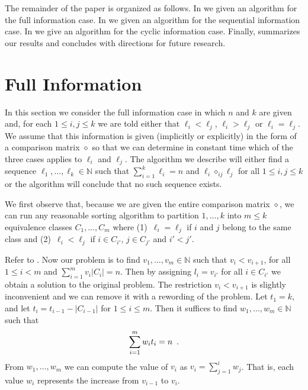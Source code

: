 \documentclass[11pt,a4paper]{article}
\newcommand{\N}{\mathbb{N}}
\newcommand{\op}{\diamond}
\newcommand{\opij}{\op_{ij}}
\begin{document}
The remainder of the paper is organized as follows.  In
 we given an algorithm for the full
information case.  In  we given an
algorithm for the sequential information case.  In
 we give an algorithm for the cyclic
information case. Finally,  summarizes our results
and concludes with directions for future research.

\section{Full Information}

In this section we consider the full information case in which $n$ and
$k$ are given and, for each $1\le i,j \le k$ we are told either that
$\ell_i< \ell_j$, $\ell_i > \ell_j$ or $\ell_i = \ell_j$.  We assume
that this information is given (implicitly or explicitly) in the form
of a comparison matrix $\op$ so that we can determine in constant time
which of the three cases applies to $\ell_i$ and $\ell_j$.  The
algorithm we describe will either find a sequence
$\ell_1,\ldots,\ell_k\in\N$ such that $\sum_{i=1}^k\ell_i = n$ and
$\ell_i\opij\ell_j$ for all $1\le i,j\le k$ or the algorithm will
conclude that no such sequence exists.

We first observe that, because we are given the entire comparison
matrix $\op$, we can run any reasonable sorting algorithm to partition
$1,\ldots,k$ into  $m\le k$ equivalence classes $C_1,\ldots,C_{m}$
where (1)~$\ell_i = \ell_j$ if $i$ and $j$ belong to the same class and
(2)~$\ell_i < \ell_j$ if $i\in C_{i'}$, $j\in C_{j'}$ and $i'< j'$.

Refer to .  Now our problem is to find
$v_1,\ldots,v_{m}\in\N$ such that $v_i < v_{i+1}$, for all $1\le i <
m$ and $\sum_{i=1}^m{v_i|C_i|} = n$.  Then by assigning $l_i=v_{i'}$
for all $i\in C_{i'}$ we obtain a solution to the original problem.
The restriction $v_i < v_{i+1}$ is slightly inconvenient and we
can remove it with a rewording of the problem.  Let $t_1 = k$,
 and let $t_i=t_{i-1}-|C_{i-1}|$ for $1\le i\le m$.  Then
it suffices to find $w_1,\ldots,w_m\in\N$ such that
\begin{equation}
       \sum_{i=1}^m w_it_i = n \enspace . \eqlabel{wis}
\end{equation}
From $w_1,\ldots, w_m$ we can compute the value of $v_i$ as 
$v_i=\sum_{j=1}^i w_j$.  That is, each value $w_i$
represents the increase from $v_{i-1}$ to $v_i$.
\end{document}
